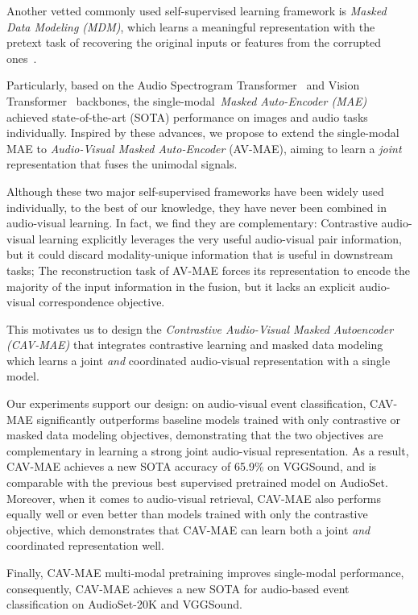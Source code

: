 \documentclass{article} \usepackage{iclr2023_conference,times}
\begin{document}
Another vetted commonly used self-supervised learning framework is \emph{Masked Data Modeling (MDM)}, which learns a meaningful representation with the pretext task of recovering the original inputs or features from the corrupted ones~\citep{devlin-etal-2019-bert}. 

Particularly, based on the Audio Spectrogram Transformer~\citep{gong21b_interspeech} and Vision Transformer~\citep{dosovitskiy2020image} backbones, the single-modal~\emph{Masked Auto-Encoder (MAE)}~\citep{he2022masked} achieved state-of-the-art (SOTA) performance on images and audio tasks~\citep{xu2022masked} individually.
Inspired by these advances, we propose to extend the single-modal MAE to \emph{Audio-Visual Masked Auto-Encoder} (AV-MAE), aiming to learn a \emph{joint} representation that fuses the unimodal signals. 

Although these two major self-supervised frameworks have been widely used individually, to the best of our knowledge, they have never been combined in audio-visual learning. In fact, we find they are complementary: Contrastive audio-visual learning explicitly leverages the very useful audio-visual pair information, but it could discard modality-unique information that is useful in downstream tasks; The reconstruction task of AV-MAE forces its representation to encode the majority of the input information in the fusion, but it lacks an explicit audio-visual correspondence objective. 

This motivates us to design the \emph{Contrastive Audio-Visual Masked Autoencoder (CAV-MAE)} that integrates contrastive learning and masked data modeling which learns a joint \emph{and} coordinated audio-visual representation with a single model. 

Our experiments support our design: on audio-visual event classification, CAV-MAE significantly outperforms baseline models trained with only contrastive or masked data modeling objectives, demonstrating that the two objectives are complementary in learning a strong joint audio-visual representation.
As a result, CAV-MAE achieves a new SOTA accuracy of 65.9\% on VGGSound, and is comparable with the previous best supervised pretrained model on AudioSet. 
Moreover, when it comes to audio-visual retrieval, CAV-MAE also performs equally well or even better than models trained with only the contrastive objective, which demonstrates that CAV-MAE can learn both a joint \emph{and} coordinated representation well.

Finally, CAV-MAE multi-modal pretraining improves single-modal performance, consequently, CAV-MAE achieves a new SOTA for audio-based event classification on AudioSet-20K and VGGSound.
\end{document}
